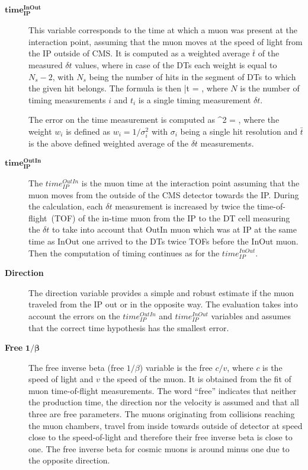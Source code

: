 \begin{description}
\item [$\mathbf{time_{IP}^{InOut}}$]
This variable corresponds to the time at which a muon was present at the interaction point, assuming that the muon moves at the speed of light from the IP outside of CMS. It is computed as a weighted average $\bar{t}$ of the measured $\delta t$ values, where in case of the DTs each weight is equal to $N_{s}-2$, with $N_{s}$ being the number of hits in the segment of DTs to which the given hit belongs. The formula is then
{
 \bar{t} =  \times {} \times {},
}
where $N$ is the number of timing measurements $i$ and $t_{i}$ is a single timing measurement $\delta t$.

The error on the time measurement is computed as
{
 \sigma^{2} =  \times {} \times {},
}
where the weight $w_{i}$ is defined as $w_i = 1/\sigma_{i}^2$ with $\sigma_{i}$ being a single hit resolution and $\bar{t}$ is the above defined weighted average of the $\delta t$ measurements.

\item[$\mathbf{time_{IP}^{OutIn}}$ ]
The $time_{IP}^{OutIn}$ is the muon time at the interaction point assuming that the muon moves from the outside of the CMS detector towards the IP. During the calculation, each $\delta t$ measurement is increased by twice the time-of-flight~(TOF) of the in-time muon from the IP to the DT cell measuring the $\delta t$ to take into account that OutIn muon which was at IP at the same time as InOut one arrived to the DTs twice TOFs before the InOut muon. Then the computation of timing continues as for the $time_{IP}^{InOut}$.

\item[\textbf{Direction}]
The direction variable provides a simple and robust estimate if the muon traveled from the IP out or in the opposite way. The evaluation takes into account the errors on the $time_{IP}^{OutIn}$ and $time_{IP}^{InOut}$ variables and assumes that the correct time hypothesis has the smallest error.

\item[\textbf{Free} $\mathbf{1/\beta}$]
The free inverse beta (free $1/\beta$) variable is the free $c/v$, where $c$ is the speed of light and $v$ the speed of the muon.  It is obtained from the fit of muon time-of-flight measurements. The word ``free'' indicates that neither the production time, the direction nor the velocity is assumed and that all three are free parameters. The muons originating from collisions reaching the muon chambers, travel from inside towards outside of detector at speed close to the speed-of-light and therefore their free inverse beta is close to one. The free inverse beta for cosmic muons is around minus one due to the opposite direction.


\end{description}
